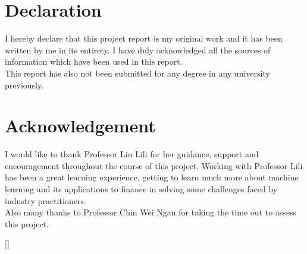 \documentclass[a4paper,12pt]{report}
\renewcommand\thechapter{\Roman{chapter}}
\numberwithin{equation}{section}
\theoremstyle{definition}
\begin{document}
\chapter*{Declaration}
\begin{center}{\large
I hereby declare that this project report is my original work and it has been written by me in its entirety. I have duly acknowledged all the sources of information which have been used in this report. \\[0.5in]
This report has also not been submitted for any degree in any university previously.
}

\chapter*{Acknowledgement}
{\large
I would like to thank Professor Liu Lili for her guidance, support and encouragement throughout the course of this project. Working with Professor Lili has been a great learning experience, getting to learn much more about machine learning and its applications to finance in solving some challenges faced by industry practitioners. \\[0.5in]
Also many thanks to Professor Chin Wei Ngan for taking the time out to assess this project.

}
\end{center}
\setcounter{secnumdepth}{3}
\setcounter{tocdepth}{3}

\titleformat{\chapter}[display]{\Large}{\centering
  \MakeUppercase{\chaptername}\quad{\Huge\thechapter}}{10pt}{\titlerule[.5pt]\vspace{10pt}\centering
  \MakeUppercase}[\vspace{10pt}{\titlerule[.5pt]}]%
\titlespacing{\chapter}{0pt}{-50pt}{1cm}%


\tableofcontents


\setcounter{chapter}{1}
\renewcommand{\thechapter}{\arabic{chapter}}
\setcounter{chapter}{0}
\setcounter{page}{0}
\end{document}
